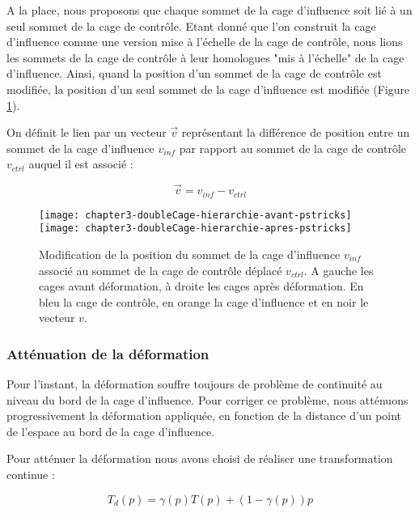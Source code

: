 A la place, nous proposons que chaque sommet de la cage d'influence soit lié à
un seul sommet de la cage de contrôle. Etant donné que l'on construit la cage
d'influence comme une version mise à l'échelle de la cage de contrôle, nous
lions les sommets de la cage de contrôle à leur homologues "mis à l'échelle"
de la cage d'influence. Ainsi, quand la position d'un sommet de la cage de
contrôle est modifiée, la position d'un seul sommet de la cage d'influence est
modifiée (Figure \ref{MELHie}).

On définit le lien par un vecteur $\overrightarrow{v}$ représentant la
différence de position entre un sommet de la cage d'influence $v_{inf}$ par
rapport au sommet de la cage de contrôle $v_{ctrl}$ auquel il est associé :

\begin{displaymath}
  \overrightarrow{v} = v_{inf}-v_{ctrl}
\end{displaymath}

\begin{figure}[ht]
\begin{center}
  \texttt{[image: chapter3-doubleCage-hierarchie-avant-pstricks]}
  \texttt{[image: chapter3-doubleCage-hierarchie-apres-pstricks]}

  \caption[Association des cages de contrôle et d'influence] {Modification de
la position du sommet de la cage d'influence $v_{inf}$ associé au sommet de la
cage de contrôle déplacé $v_{ctrl}$. A gauche les cages avant déformation, à
droite les cages après déformation. En bleu la cage de contrôle, en orange la
cage d'influence et en noir le vecteur $v$.}

  \label{MELHie}
\end{center}
\end{figure}

\subsubsection{Atténuation de la déformation}

Pour l'instant, la déformation souffre toujours de problème de continuité au
niveau du bord de la cage d'influence. Pour corriger ce problème, nous
atténuons progressivement la déformation appliquée, en fonction de la distance
d'un point de l'espace au bord de la cage d'influence.

Pour atténuer la déformation nous avons choisi de réaliser une transformation
continue :

\begin{equation}
  T_{d}(p) = \gamma(p) T(p) + (1-\gamma(p)) p
  \label{MELAtt}
\end{equation}

